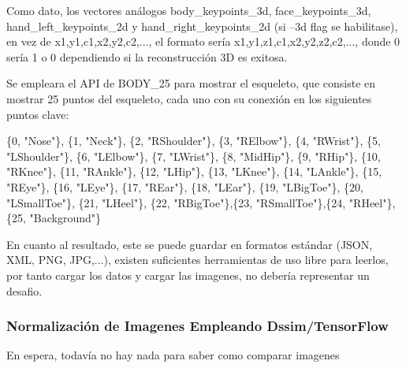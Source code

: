 Como dato, los vectores análogos body\_keypoints\_3d, face\_keypoints\_3d,
hand\_left\_keypoints\_2d y hand\_right\_keypoints\_2d (si --3d flag se habilitase), en vez de 
x1,y1,c1,x2,y2,c2,..., el formato sería x1,y1,z1,c1,x2,y2,z2,c2,..., donde 0 sería 1 o 0 dependiendo si la reconstrucción 3D es exitosa.

Se empleara el API de BODY\_25 para mostrar el esqueleto, que consiste en mostrar 25 puntos del esqueleto, cada uno con su conexión en los siguientes puntos clave:

\{0,  "Nose"\}, \{1,  "Neck"\}, \{2,  "RShoulder"\}, \{3,  "RElbow"\}, \{4,  "RWrist"\}, 
\{5,  "LShoulder"\}, \{6,  "LElbow"\}, \{7,  "LWrist"\}, \{8,  "MidHip"\}, \{9,  "RHip"\},
\{10, "RKnee"\}, \{11, "RAnkle"\}, \{12, "LHip"\}, \{13, "LKnee"\}, \{14, "LAnkle"\}, 
\{15, "REye"\}, \{16, "LEye"\}, \{17, "REar"\}, \{18, "LEar"\}, \{19, "LBigToe"\},
\{20, "LSmallToe"\}, \{21, "LHeel"\}, \{22, "RBigToe"\},\{23, "RSmallToe"\},\{24, "RHeel"\},
\{25, "Background"\}


En cuanto al resultado, este se puede guardar en formatos estándar (JSON, XML, PNG, JPG,...), existen suficientes herramientas de uso libre para leerlos, por tanto cargar los datos y cargar las imagenes, no debería representar un desafio.



\subsubsection{Normalización de Imagenes Empleando Dssim/TensorFlow}

En espera, todavía no hay nada para saber como comparar imagenes




